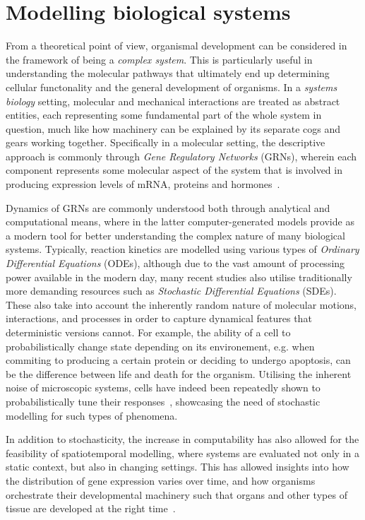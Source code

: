 \section{Modelling biological systems} %
\label{sec:modelling}
From a theoretical point of view, organismal development can be
considered in the framework of being a \textit{complex system}. This is
particularly useful in understanding the molecular pathways that ultimately end
up determining cellular functonality and the general development of organisms.
In a \textit{systems biology} setting, molecular and mechanical interactions are
treated as abstract entities, each representing some fundamental part of the
whole system in question, much like how machinery can be explained by its
separate cogs and gears working together. Specifically in a molecular setting,
the descriptive approach is commonly through \textit{Gene Regulatory Networks}
(GRNs), wherein each component represents some molecular aspect of the system
that is involved in producing expression levels of mRNA, proteins and
hormones~\cite{kitano2002systems}.

Dynamics of GRNs are commonly understood both through analytical and computational means,
where in the latter computer-generated models provide as a modern tool for
better understanding the complex nature of many biological systems. Typically,
reaction kinetics are modelled using various types of \textit{Ordinary
  Differential Equations} (ODEs), although due to the vast amount of processing
power available in the modern day, many recent studies also utilise
traditionally more demanding resources such as \textit{Stochastic Differential
  Equations} (SDEs). These also take into account the inherently random nature of molecular
motions, interactions, and processes in order to capture dynamical features that
deterministic versions cannot. For example, the ability of a cell to
probabilistically change state depending on its environement, e.g.
when commiting to producing a certain protein or deciding to undergo apoptosis,
can be the difference between life and death for the organism. Utilising the
inherent noise of microscopic 
systems, cells have indeed been repeatedly shown to probabilistically tune their
responses~\cite{locke2011stochastic,losick2008stochasticity,mennstochastic}, showcasing the need of stochastic modelling for such types of
phenomena.

In addition to stochasticity, the increase in computability has also allowed for
the feasibility of spatiotemporal modelling, where systems are evaluated not only
in a static context, but also in changing settings. This has allowed insights
into how the distribution of gene expression varies over time, and how organisms
orchestrate their developmental machinery such that organs and other types of
tissue are developed at the right time~\cite{ietswaart2015spatiotemporal}. 

